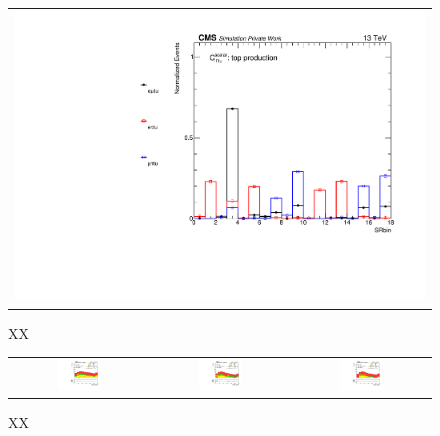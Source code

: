  \begin{figure}[tbh!]
 \begin{center}
 \begin{tabular}{c}
 \includegraphics[width=\textwidth]{figures/Part4/ObjEvt/SRbin}
 \end{tabular}
 \caption{XX}
 \label{fig:Summary}
 \end{center}
 \end{figure}
 
 \begin{figure}[tbh!]
 \begin{center}
 \begin{tabular}{ccc}
 \includegraphics[width=0.33\textwidth]{figures/Part4/ObjEvt/LFVemuM}&
  \includegraphics[width=0.33\textwidth]{figures/Part4/ObjEvt/LFVetaM}&
   \includegraphics[width=0.33\textwidth]{figures/Part4/ObjEvt/LFVmutaM}\\
 \end{tabular}
 \caption{XX}
 \label{fig:Summary}
 \end{center}
 \end{figure}


